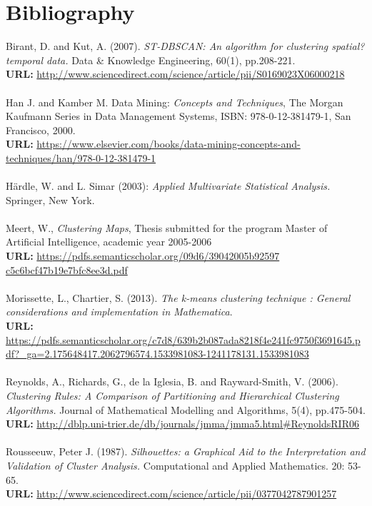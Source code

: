 \documentclass[a4paper,12pt,fleqn]{article}
\begin{document}
\section*{Bibliography}
Birant, D. and Kut, A. (2007). \textit{ST-DBSCAN: An algorithm for clustering spatial?temporal data.} Data \& Knowledge Engineering, 60(1), pp.208-221.\\
\textbf{URL:} \url{http://www.sciencedirect.com/science/article/pii/S0169023X06000218}\\
\\
Han J. and Kamber M. Data Mining: \textit{Concepts and Techniques}, The Morgan Kaufmann Series in Data Management Systems, ISBN:  978-0-12-381479-1, San Francisco, 2000. \\
\textbf{URL:} \url{https://www.elsevier.com/books/data-mining-concepts-and-techniques/han/978-0-12-381479-1}\\
\\
Härdle, W. and L. Simar (2003): \textit{Applied Multivariate Statistical Analysis.} Springer, New York.\\
\\
Meert, W., \textit{Clustering Maps}, Thesis submitted for the program Master of Artificial Intelligence, academic year 2005-2006\\
\textbf{URL:} \url{https://pdfs.semanticscholar.org/09d6/39042005b92597 c5c6bcf47b19e7bfc8ee3d.pdf}\\
\\
Morissette, L., Chartier, S. (2013). \textit{The k-means clustering technique : General considerations and implementation in Mathematica}. \\
\textbf{URL:} \url{https://pdfs.semanticscholar.org/c7d8/639b2b087ada8218f4e241fc9750f3691645.pdf?_ga=2.175648417.2062796574.1533981083-1241178131.1533981083}\\
\\
Reynolds, A., Richards, G., de la Iglesia, B. and Rayward-Smith, V. (2006). \textit{Clustering Rules: A Comparison of Partitioning and Hierarchical Clustering Algorithms.} Journal of Mathematical Modelling and Algorithms, 5(4), pp.475-504.\\
\textbf{URL:} \url{http://dblp.uni-trier.de/db/journals/jmma/jmma5.html#ReynoldsRIR06}\\
\\
Rousseeuw, Peter J. (1987). \textit{Silhouettes: a Graphical Aid to the Interpretation and Validation of Cluster Analysis.} Computational and Applied Mathematics. 20: 53-65. \\
\textbf{URL:} \url{http://www.sciencedirect.com/science/article/pii/0377042787901257}\\
\end{document}
